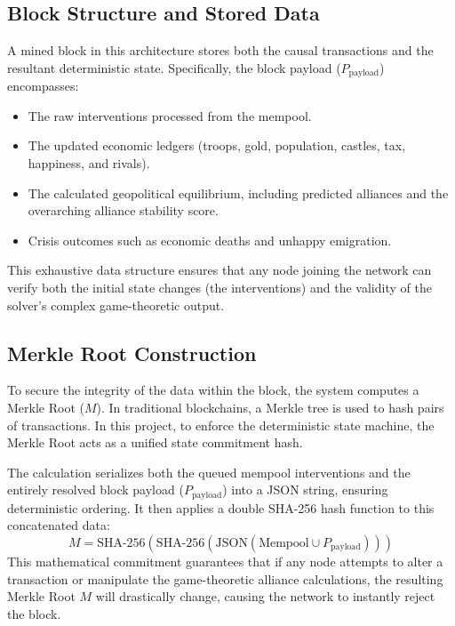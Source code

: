 \subsection{Block Structure and Stored Data}
A mined block in this architecture stores both the causal transactions and the resultant deterministic state. Specifically, the block payload ($P_{\text{payload}}$) encompasses:
\begin{itemize}
    \item The raw interventions processed from the mempool.
    \item The updated economic ledgers (troops, gold, population, castles, tax, happiness, and rivals).
    \item The calculated geopolitical equilibrium, including predicted alliances and the overarching alliance stability score.
    \item Crisis outcomes such as economic deaths and unhappy emigration.
\end{itemize}
This exhaustive data structure ensures that any node joining the network can verify both the initial state changes (the interventions) and the validity of the solver's complex game-theoretic output.

\subsection{Merkle Root Construction}
To secure the integrity of the data within the block, the system computes a Merkle Root ($M$). In traditional blockchains, a Merkle tree is used to hash pairs of transactions. In this project, to enforce the deterministic state machine, the Merkle Root acts as a unified state commitment hash.

The calculation serializes both the queued mempool interventions and the entirely resolved block payload ($P_{\text{payload}}$) into a JSON string, ensuring deterministic ordering. It then applies a double SHA-256 hash function to this concatenated data:
\begin{equation}
M = \text{SHA-256}\left(\text{SHA-256}\left( \text{JSON}\left( \text{Mempool} \cup P_{\text{payload}} \right) \right)\right)
\end{equation}
This mathematical commitment guarantees that if any node attempts to alter a transaction or manipulate the game-theoretic alliance calculations, the resulting Merkle Root $M$ will drastically change, causing the network to instantly reject the block.

